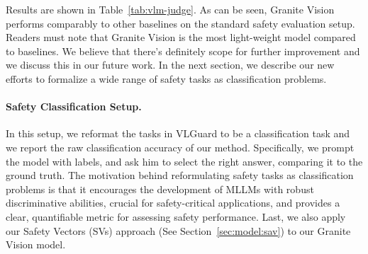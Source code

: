 
Results are shown in Table~\ref{tab:vlm-judge}. As can be seen, Granite Vision performs comparably to other baselines on the standard safety evaluation setup. Readers must note that Granite Vision is the most light-weight model compared to baselines. We believe that there's definitely scope for further improvement and we discuss this in our future work. 
In the next section, we describe our new efforts to formalize a wide range of safety tasks as classification problems.



\paragraph{Safety Classification Setup.} In this setup, we reformat the tasks in VLGuard to be a classification task and we report the raw classification accuracy of our method. Specifically, we prompt the model with labels, and ask him to select the right answer, comparing it to the ground truth. The motivation behind reformulating safety tasks as classification problems is that it encourages the development of MLLMs with robust discriminative abilities, crucial for safety-critical applications, and provides a clear, quantifiable metric for assessing safety performance. Last, we also apply our Safety Vectors (SVs) approach (See Section~\ref{sec:model:sav}) to our Granite Vision model.




